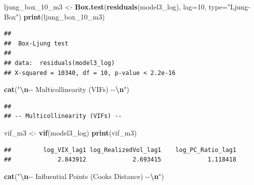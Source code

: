 \documentclass[
]{article}
\newenvironment{Shaded}{\begin{snugshade}}{\end{snugshade}}
\newcommand{\AttributeTok}[1]{\textcolor[rgb]{0.13,0.29,0.53}{#1}}
\newcommand{\DecValTok}[1]{\textcolor[rgb]{0.00,0.00,0.81}{#1}}
\newcommand{\FunctionTok}[1]{\textcolor[rgb]{0.13,0.29,0.53}{\textbf{#1}}}
\newcommand{\NormalTok}[1]{#1}
\newcommand{\OtherTok}[1]{\textcolor[rgb]{0.56,0.35,0.01}{#1}}
\newcommand{\SpecialCharTok}[1]{\textcolor[rgb]{0.81,0.36,0.00}{\textbf{#1}}}
\newcommand{\StringTok}[1]{\textcolor[rgb]{0.31,0.60,0.02}{#1}}
\begin{document}
\begin{Shaded}
\begin{Highlighting}[]
\NormalTok{  ljung\_box\_10\_m3 }\OtherTok{\textless{}{-}} \FunctionTok{Box.test}\NormalTok{(}\FunctionTok{residuals}\NormalTok{(model3\_log), }\AttributeTok{lag=}\DecValTok{10}\NormalTok{, }\AttributeTok{type=}\StringTok{"Ljung{-}Box"}\NormalTok{)}
  \FunctionTok{print}\NormalTok{(ljung\_box\_10\_m3)}
\end{Highlighting}
\end{Shaded}

\begin{verbatim}
## 
##  Box-Ljung test
## 
## data:  residuals(model3_log)
## X-squared = 10340, df = 10, p-value < 2.2e-16
\end{verbatim}

\begin{Shaded}
\begin{Highlighting}[]
  \FunctionTok{cat}\NormalTok{(}\StringTok{"}\SpecialCharTok{\textbackslash{}n}\StringTok{{-}{-} Multicollinearity (VIFs) {-}{-}}\SpecialCharTok{\textbackslash{}n}\StringTok{"}\NormalTok{)}
\end{Highlighting}
\end{Shaded}

\begin{verbatim}
## 
## -- Multicollinearity (VIFs) --
\end{verbatim}

\begin{Shaded}
\begin{Highlighting}[]
\NormalTok{  vif\_m3 }\OtherTok{\textless{}{-}} \FunctionTok{vif}\NormalTok{(model3\_log)}
  \FunctionTok{print}\NormalTok{(vif\_m3)}
\end{Highlighting}
\end{Shaded}

\begin{verbatim}
##         log_VIX_lag1 log_RealizedVol_lag1    log_PC_Ratio_lag1 
##             2.843912             2.693415             1.118418
\end{verbatim}

\begin{Shaded}
\begin{Highlighting}[]
  \FunctionTok{cat}\NormalTok{(}\StringTok{"}\SpecialCharTok{\textbackslash{}n}\StringTok{{-}{-} Influential Points (Cook\textquotesingle{}s Distance) {-}{-}}\SpecialCharTok{\textbackslash{}n}\StringTok{"}\NormalTok{)}
\end{Highlighting}
\end{Shaded}
\end{document}
